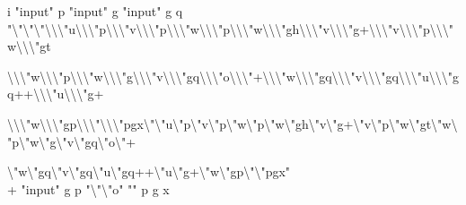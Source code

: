 \begin{smurf}
\footnotesize
i "input" p
"input" g
"input" g q
"\textbackslash{}"\textbackslash{}"\textbackslash{}"\textbackslash{}\textbackslash{}\textbackslash{}"u\textbackslash{}\textbackslash{}\textbackslash{}"p\textbackslash{}\textbackslash{}\textbackslash{}"v\textbackslash{}\textbackslash{}\textbackslash{}"p\textbackslash{}\textbackslash{}\textbackslash{}"w\textbackslash{}\textbackslash{}\textbackslash{}"p\textbackslash{}\textbackslash{}\textbackslash{}"w\textbackslash{}\textbackslash{}\textbackslash{}"gh\textbackslash{}\textbackslash{}\textbackslash{}"v\textbackslash{}\textbackslash{}\textbackslash{}"g+\textbackslash{}\textbackslash{}\textbackslash{}"v\textbackslash{}\textbackslash{}\textbackslash{}"p\textbackslash{}\textbackslash{}\textbackslash{}"w\textbackslash{}\textbackslash{}\textbackslash{}"gt 

\textbackslash{}\textbackslash{}\textbackslash{}"w\textbackslash{}\textbackslash{}\textbackslash{}"p\textbackslash{}\textbackslash{}\textbackslash{}"w\textbackslash{}\textbackslash{}\textbackslash{}"g\textbackslash{}\textbackslash{}\textbackslash{}"v\textbackslash{}\textbackslash{}\textbackslash{}"gq\textbackslash{}\textbackslash{}\textbackslash{}"o\textbackslash{}\textbackslash{}\textbackslash{}"+\textbackslash{}\textbackslash{}\textbackslash{}"w\textbackslash{}\textbackslash{}\textbackslash{}"gq\textbackslash{}\textbackslash{}\textbackslash{}"v\textbackslash{}\textbackslash{}\textbackslash{}"gq\textbackslash{}\textbackslash{}\textbackslash{}"u\textbackslash{}\textbackslash{}\textbackslash{}"gq++\textbackslash{}\textbackslash{}\textbackslash{}"u\textbackslash{}\textbackslash{}\textbackslash{}"g+

\textbackslash{}\textbackslash{}\textbackslash{}"w\textbackslash{}\textbackslash{}\textbackslash{}"gp\textbackslash{}\textbackslash{}\textbackslash{}"\textbackslash{}\textbackslash{}\textbackslash{}"pgx\textbackslash{}"\textbackslash{}"u\textbackslash{}"p\textbackslash{}"v\textbackslash{}"p\textbackslash{}"w\textbackslash{}"p\textbackslash{}"w\textbackslash{}"gh\textbackslash{}"v\textbackslash{}"g+\textbackslash{}"v\textbackslash{}"p\textbackslash{}"w\textbackslash{}"gt\textbackslash{}"w\textbackslash{}"p\textbackslash{}"w\textbackslash{}"g\textbackslash{}"v\textbackslash{}"gq\textbackslash{}"o\textbackslash{}"+

\textbackslash{}"w\textbackslash{}"gq\textbackslash{}"v\textbackslash{}"gq\textbackslash{}"u\textbackslash{}"gq++\textbackslash{}"u\textbackslash{}"g+\textbackslash{}"w\textbackslash{}"gp\textbackslash{}"\textbackslash{}"pgx"
\\
+
"input" g p
"\textbackslash{}"\textbackslash{}"o" "" p
g x
\end{smurf}

